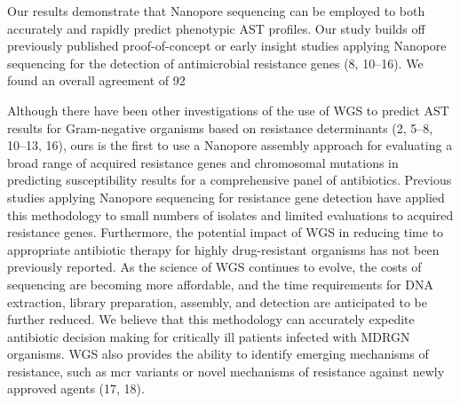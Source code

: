 Our results demonstrate that Nanopore sequencing can be employed to both accurately and rapidly predict phenotypic AST profiles. Our study builds off previously published proof-of-concept or early insight studies applying Nanopore sequencing for the detection of antimicrobial resistance genes (8, 10–16). We found an overall agreement of 92%

Although there have been other investigations of the use of WGS to predict AST results for Gram-negative organisms based on resistance determinants (2, 5–8, 10–13, 16), ours is the first to use a Nanopore assembly approach for evaluating a broad range of acquired resistance genes and chromosomal mutations in predicting susceptibility results for a comprehensive panel of antibiotics. Previous studies applying Nanopore sequencing for resistance gene detection have applied this methodology to small numbers of isolates and limited evaluations to acquired resistance genes. Furthermore, the potential impact of WGS in reducing time to appropriate antibiotic therapy for highly drug-resistant organisms has not been previously reported. As the science of WGS continues to evolve, the costs of sequencing are becoming more affordable, and the time requirements for DNA extraction, library preparation, assembly, and detection are anticipated to be further reduced. We believe that this methodology can accurately expedite antibiotic decision making for critically ill patients infected with MDRGN organisms. WGS also provides the ability to identify emerging mechanisms of resistance, such as mcr variants or novel mechanisms of resistance against newly approved agents (17, 18).


